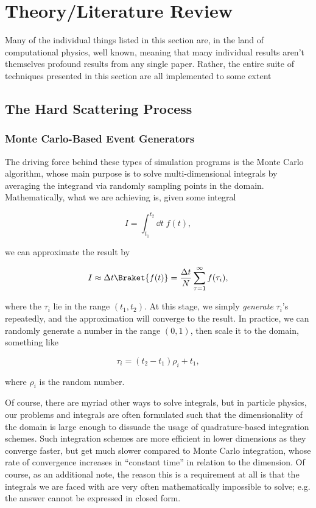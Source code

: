 \section{Theory/Literature Review}\label{sec:Theory-Lit-Review}

Many of the individual things listed in this section are, in the land of computational physics, well known, meaning that many individual results aren't themselves profound results from any single paper. Rather, the entire suite of techniques presented in this section are all implemented to some extent

\subsection{The Hard Scattering Process}

\subsubsection{Monte Carlo-Based Event Generators}

The driving force behind these types of simulation programs is the Monte Carlo algorithm, whose main purpose is to solve multi-dimensional integrals by averaging the integrand via randomly sampling points in the domain. Mathematically, what we are achieving is, given some integral

\begin{equation}
  I = \int_{t_1}^{t_2} \dd t \; f(t),
\end{equation}

we can approximate the result by

\begin{equation}
  I \approx \Delta t \Braket{f(t)} = \frac{\Delta t}{N} \sum_{\tau=1}^{\infty} f(\tau_i),
\end{equation}

where the $\tau_i$ lie in the range $(t_1,t_2)$. At this stage, we simply \textit{generate} $\tau_i$'s repeatedly, and the approximation will converge to the result. In practice, we can randomly generate a number in the range $(0,1)$, then scale it to the domain, something like

\begin{equation}
  \tau_i = (t_2 - t_1)\rho_i + t_1,
\end{equation}

where $\rho_i$ is the random number.

Of course, there are myriad other ways to solve integrals, but in particle physics, our problems and integrals are often formulated such that the dimensionality of the domain is large enough to dissuade the usage of quadrature-based integration schemes. Such integration schemes are more efficient in lower dimensions as they converge faster, but get much slower compared to Monte Carlo integration, whose rate of convergence increases in ``constant time'' in relation to the dimension. Of course, as an additional note, the reason this is a requirement at all is that the integrals we are faced with are very often mathematically impossible to solve; e.g. the answer cannot be expressed in closed form.

